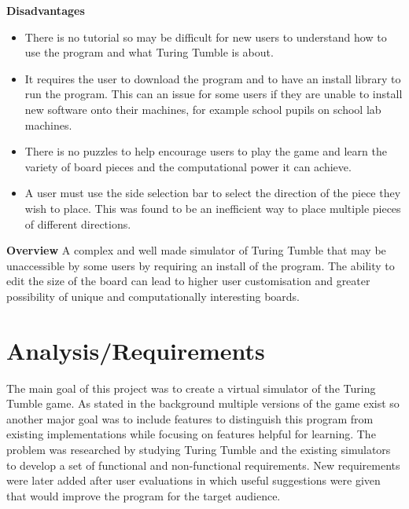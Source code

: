 \documentclass{l4proj}
\begin{document}
\textbf{Disadvantages}
\begin{itemize}
    \item There is no tutorial so may be difficult for new users to understand how to use the program and what Turing Tumble is about.
    \item It requires the user to download the program and to have an install library to run the program. This can an issue for some users if they are unable to install new software onto their machines, for example school pupils on school lab machines.
    \item There is no puzzles to help encourage users to play the game and learn the variety of board pieces and the computational power it can achieve.
    \item A user must use the side selection bar to select the direction of the piece they wish to place. This was found to be an inefficient way to place multiple pieces of different directions.
\end{itemize}

\textbf{Overview}
A complex and well made simulator of Turing Tumble that may be unaccessible by some users by requiring an install of the program. The ability to edit the size of the board can lead to higher user customisation and greater possibility of unique and computationally interesting boards. 
\chapter{Analysis/Requirements}
\label{section:reqs}



The main goal of this project was to create a virtual simulator of the Turing Tumble game. As stated in the background multiple versions of the game exist so another major goal was to include features to distinguish this program from existing implementations while focusing on features helpful for learning. The problem was researched by studying Turing Tumble and the existing simulators to develop a set of functional and non-functional requirements. New requirements were later added after user evaluations in which useful suggestions were given that would improve the program for the target audience.
\end{document}
